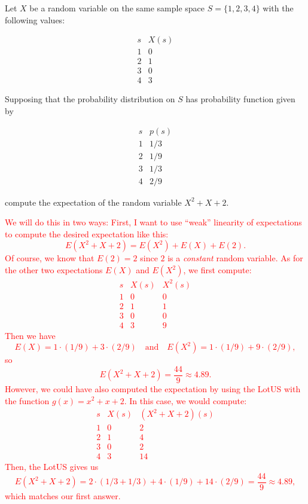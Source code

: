 \documentclass[12pt,reqno]{amsart}
\begin{document}
\bigskip
\prob Let $X$ be a random variable on the same sample space $S = \{1,2,3,4\}$ with the following values:

	\[
	\begin{array}{c|c}
	s & X(s)  \\ \hline
	1 & 0  \\
	2 & 1  \\
	3 & 0 \\
	4 & 3
	\end{array}
	\]

Supposing that the probability distribution on $S$ has probability function given by

	\[
	\begin{array}{c|c}
	s & p(s)  \\ \hline
	1 & 1/3  \\
	2 & 1/9  \\
	3 & 1/3 \\
	4 & 2/9
	\end{array}
	\]

compute the expectation of the random variable $X^2 + X + 2$.

\bigskip
\textcolor{red}{We will do this in two ways: First, I want to use ``weak'' linearity of expectations to compute the desired expectation like this:
	\[
	E(X^2 + X + 2) = E(X^2) + E(X) + E(2).
	\]
Of course, we know that $E(2)=2$ since $2$ is a \textit{constant} random variable. As for the other two expectations $E(X)$ and $E(X^2)$, we first compute:
	\[
	\begin{array}{c|cc}
	s & X(s) & X^2(s)  \\ \hline
	1 & 0 & 0  \\
	2 & 1 & 1  \\
	3 & 0 & 0 \\
	4 & 3 & 9
	\end{array}
	\]
Then we have
	\[
	E(X) = 1\cdot (1/9) + 3\cdot(2/9) \quad \text{and} \quad E(X^2) = 1 \cdot (1/9) + 9 \cdot (2/9),
	\]
so
	\[
	E(X^2 + X +2) = \frac{44}{9} \approx 4.89.
	\]
However, we could have also computed the expectation by using the LotUS with the function $g(x) = x^2 + x + 2$. In this case, we would compute:
	\[
	\begin{array}{c|cc}
	s & X(s) & (X^2 + X +2)(s)  \\ \hline
	1 & 0 & 2  \\
	2 & 1 & 4  \\
	3 & 0 & 2 \\
	4 & 3 & 14
	\end{array}
	\]
Then, the LotUS gives us
	\[
	E(X^2 + X + 2) = 2\cdot (1/3 + 1/3) + 4\cdot (1/9) + 14\cdot (2/9) = \frac{44}{9} \approx 4.89,
	\]
which matches our first answer.}
\end{document}
